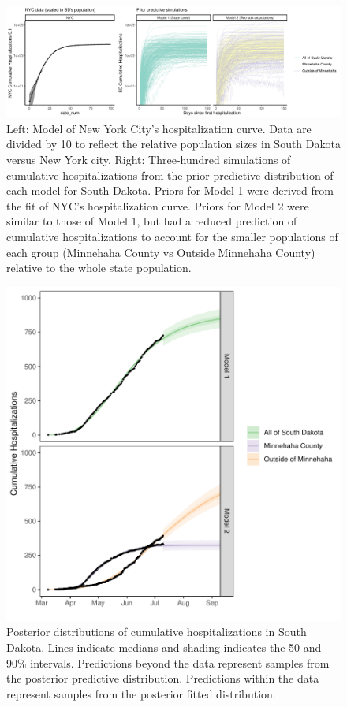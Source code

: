 \documentclass[
]{article}
\begin{document}
\begin{figure}
\centering
\includegraphics{manuscript_files/figure-latex/plot-nyc-1.pdf}
\caption{\label{fig:plot-nyc}Left: Model of New York City's hospitalization curve. Data are divided by 10 to reflect the relative population sizes in South Dakota versus New York city. Right: Three-hundred simulations of cumulative hospitalizations from the prior predictive distribution of each model for South Dakota. Priors for Model 1 were derived from the fit of NYC's hospitalization curve. Priors for Model 2 were similar to those of Model 1, but had a reduced prediction of cumulative hospitalizations to account for the smaller populations of each group (Minnehaha County vs Outside Minnehaha County) relative to the whole state population.\label{prior:plot}}
\end{figure}

\begin{figure}
\centering
\includegraphics{manuscript_files/figure-latex/unnamed-chunk-3-1.pdf}
\caption{\label{fig:unnamed-chunk-3}Posterior distributions of cumulative hospitalizations in South Dakota. Lines indicate medians and shading indicates the 50 and 90\% intervals. Predictions beyond the data represent samples from the posterior predictive distribution. Predictions within the data represent samples from the posterior fitted distribution.\label{post_all:plot}}
\end{figure}
\end{document}
